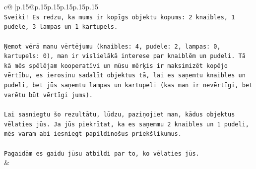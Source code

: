 \documentclass{article}
\begin{document}
{\begin{supertabular}{c@{$\;$}|p{.15\linewidth}@{}p{.15\linewidth}p{.15\linewidth}p{.15\linewidth}p{.15\linewidth}p{.15\linewidth}}
{{{\\ 
\texttt{Sveiki! Es redzu, ka mums ir kopīgs objektu kopums: 2 knaibles, 1 pudele, 3 lampas un 1 kartupels.} \\
\\ 
\texttt{Ņemot vērā manu vērtējumu (knaibles: 4, pudele: 2, lampas: 0, kartupels: 0), man ir vislielākā interese par knaiblēm un pudeli. Tā kā mēs spēlējam kooperatīvi un mūsu mērķis ir maksimizēt kopējo vērtību, es ierosinu sadalīt objektus tā, lai es saņemtu knaibles un pudeli, bet jūs saņemtu lampas un kartupeli (kas man ir nevērtīgi, bet varētu būt vērtīgi jums).} \\
\\ 
\texttt{Lai sasniegtu šo rezultātu, lūdzu, paziņojiet man, kādus objektus vēlaties jūs. Ja jūs piekrītat, ka es saņemmu 2 knaibles un 1 pudeli, mēs varam abi iesniegt papildinošus priekšlikumus.} \\
\\ 
\texttt{Pagaidām es gaidu jūsu atbildi par to, ko vēlaties jūs.} \\
            }
        }
    }
    & \\ \\


\end{supertabular}}
\end{document}
